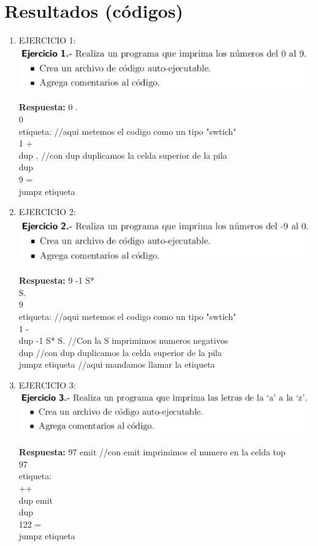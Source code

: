 \documentclass[conference]{IEEEtran}
\begin{document}
\section{Resultados (códigos)}
\begin{enumerate}
\item  EJERCICIO 1:\\
	\includegraphics{e1} \\
	\begin{center}
	\textbf{Respuesta: } 0 . \\ 0 \\ etiqueta: //aqui metemos el codigo como un tipo "swtich" \\ 1 + \\ dup . //con dup duplicamos la celda superior de la pila \\ dup \\ 9 = \\ jumpz etiqueta
	\end{center}
	
\item  EJERCICIO 2:\\
	\includegraphics{e2} \\
	\begin{center}
	\textbf{Respuesta: } 9 -1 S* \\ S. \\ 9 \\ etiqueta: //aqui metemos el codigo como un tipo "swtich" \\ 1 - \\ dup -1 S* S. //Con la S imprimimos numeros negativos \\ dup //con dup duplicamos la celda superior de la pila \\ jumpz etiqueta //aqui mandamos llamar la etiqueta
	\end{center}
	
\item  EJERCICIO 3:\\
	\includegraphics{e3} \\
	\begin{center}
	\textbf{Respuesta: } 97 emit //con emit imprimimos el numero en la celda top \\ 97 \\ etiqueta: \\ ++ \\ dup emit \\ dup \\ 122 = \\ jumpz etiqueta \newpage


\end{center}
\end{enumerate}
\end{document}
